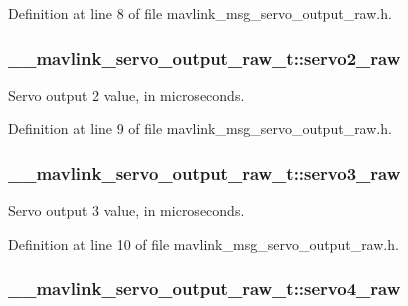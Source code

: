 Definition at line 8 of file mavlink\-\_\-msg\-\_\-servo\-\_\-output\-\_\-raw.\-h.

\hypertarget{struct____mavlink__servo__output__raw__t_aa19900df91d866a507cf3261d4b6aeda}{
\subsubsection[{servo2\-\_\-raw}]{ \-\_\-\-\_\-mavlink\-\_\-servo\-\_\-output\-\_\-raw\-\_\-t\-::servo2\-\_\-raw}}\label{struct____mavlink__servo__output__raw__t_aa19900df91d866a507cf3261d4b6aeda}


Servo output 2 value, in microseconds. 



Definition at line 9 of file mavlink\-\_\-msg\-\_\-servo\-\_\-output\-\_\-raw.\-h.

\hypertarget{struct____mavlink__servo__output__raw__t_a8aa15f79b56b08694b77bfa6d1788554}{
\subsubsection[{servo3\-\_\-raw}]{ \-\_\-\-\_\-mavlink\-\_\-servo\-\_\-output\-\_\-raw\-\_\-t\-::servo3\-\_\-raw}}\label{struct____mavlink__servo__output__raw__t_a8aa15f79b56b08694b77bfa6d1788554}


Servo output 3 value, in microseconds. 



Definition at line 10 of file mavlink\-\_\-msg\-\_\-servo\-\_\-output\-\_\-raw.\-h.

\hypertarget{struct____mavlink__servo__output__raw__t_aa9a775a58d71f44c00955771dc758012}{
\subsubsection[{servo4\-\_\-raw}]{ \-\_\-\-\_\-mavlink\-\_\-servo\-\_\-output\-\_\-raw\-\_\-t\-::servo4\-\_\-raw}}\label{struct____mavlink__servo__output__raw__t_aa9a775a58d71f44c00955771dc758012}


